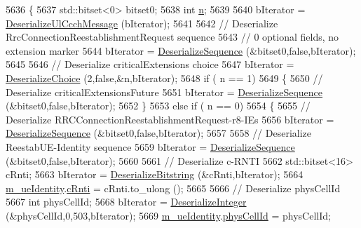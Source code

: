 \begin{DoxyCode}
5636 \{
5637   std::bitset<0> bitset0;
5638   \textcolor{keywordtype}{int} \hyperlink{namespacesample-rng-plot_aeb5ee5c431e338ef39b7ac5431242e1d}{n};
5639 
5640   bIterator = \hyperlink{classns3_1_1RrcUlCcchMessage_a763d3d5779d53fe7244be7a0f25e4cba}{DeserializeUlCcchMessage} (bIterator);
5641 
5642   \textcolor{comment}{// Deserialize RrcConnectionReestablishmentRequest sequence}
5643   \textcolor{comment}{// 0 optional fields, no extension marker}
5644   bIterator = \hyperlink{classns3_1_1Asn1Header_a58c68bb97ba3fe2e8fcdd7c208d672b2}{DeserializeSequence} (&bitset0,\textcolor{keyword}{false},bIterator);
5645 
5646   \textcolor{comment}{// Deserialize criticalExtensions choice}
5647   bIterator = \hyperlink{classns3_1_1Asn1Header_a0af5881f07a0549a8693a1b75c229a90}{DeserializeChoice} (2,\textcolor{keyword}{false},&n,bIterator);
5648   \textcolor{keywordflow}{if} ( n == 1)
5649     \{
5650       \textcolor{comment}{// Deserialize criticalExtensionsFuture}
5651       bIterator = \hyperlink{classns3_1_1Asn1Header_a58c68bb97ba3fe2e8fcdd7c208d672b2}{DeserializeSequence} (&bitset0,\textcolor{keyword}{false},bIterator);
5652     \}
5653   \textcolor{keywordflow}{else} \textcolor{keywordflow}{if} ( n == 0)
5654     \{
5655       \textcolor{comment}{// Deserialize RRCConnectionReestablishmentRequest-r8-IEs}
5656       bIterator = \hyperlink{classns3_1_1Asn1Header_a58c68bb97ba3fe2e8fcdd7c208d672b2}{DeserializeSequence} (&bitset0,\textcolor{keyword}{false},bIterator);
5657 
5658       \textcolor{comment}{// Deserialize ReestabUE-Identity sequence}
5659       bIterator = \hyperlink{classns3_1_1Asn1Header_a58c68bb97ba3fe2e8fcdd7c208d672b2}{DeserializeSequence} (&bitset0,\textcolor{keyword}{false},bIterator);
5660 
5661       \textcolor{comment}{// Deserialize c-RNTI}
5662       std::bitset<16> cRnti;
5663       bIterator = \hyperlink{classns3_1_1Asn1Header_adb34498b05e8562fba5d40f49578968d}{DeserializeBitstring} (&cRnti,bIterator);
5664       \hyperlink{classns3_1_1RrcConnectionReestablishmentRequestHeader_a35a87c6767d3bd47ef67688a98157bae}{m\_ueIdentity}.\hyperlink{structns3_1_1LteRrcSap_1_1ReestabUeIdentity_aa5bbd6336e92bf028cb8841e6669f9e6}{cRnti} = cRnti.to\_ulong ();
5665 
5666       \textcolor{comment}{// Deserialize physCellId}
5667       \textcolor{keywordtype}{int} physCellId;
5668       bIterator = \hyperlink{classns3_1_1Asn1Header_a49802c9af30018b078150e866b6ecae2}{DeserializeInteger} (&physCellId,0,503,bIterator);
5669       \hyperlink{classns3_1_1RrcConnectionReestablishmentRequestHeader_a35a87c6767d3bd47ef67688a98157bae}{m\_ueIdentity}.\hyperlink{structns3_1_1LteRrcSap_1_1ReestabUeIdentity_a90790c6986fc2f29df81220832eb4834}{physCellId} = physCellId;

\end{DoxyCode}
